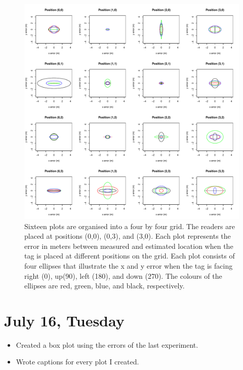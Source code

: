 \documentclass[a4paper,12pt]{article}
\begin{document}
\begin{figure}
	\begin{center}
		\includegraphics[width=1\textwidth]{error_distance_grid}
		\caption{Sixteen plots are organised into a four by four grid. The readers are placed at positions (0,0), (0,3), and (3,0). Each plot represents the error in meters between measured and estimated location when the tag is placed at different positions on the grid. Each plot consists of four ellipses that illustrate the x and y error when the tag is facing right (0\textdegree), up(90\textdegree), left (180\textdegree), and down (270\textdegree). The colours of the ellipses are red, green, blue, and black, respectively.}
	\end{center}
\end{figure}

\section{July 16, Tuesday}

\begin{itemize}
	\item Created a box plot using the errors of the last experiment.
	\item Wrote captions for every plot I created.
\end{itemize}
\end{document}
